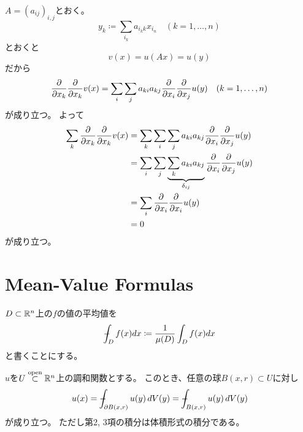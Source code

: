 \documentclass[report]{jlreq}
\begin{document}
\begin{answer}
    $A = (a_{ij})_{i,j}$とおく。
    \begin{equation}
        y_k \coloneqq \sum_{i_k} a_{i_k k} x_{i_n}
        \quad
        (k = 1, \dots, n)
    \end{equation}
    とおくと
    \begin{equation}
        v(x) = u(Ax) = u(y)
    \end{equation}
    だから
    \begin{equation}
        \deldel{x_k} \deldel{x_k} v(x)
            = \sum_{i} \sum_{j}
            a_{ki} a_{kj} \deldel{x_i} \deldel{x_j} u(y)
            \quad (k = 1, \dots, n)
    \end{equation}
    が成り立つ。
    よって
    \begin{alignat}{1}
        \sum_{k} \deldel{x_k} \deldel{x_k} v(x)
            &= \sum_{k} \sum_{i} \sum_{j}
                a_{ki} a_{kj} \deldel{x_i} \deldel{x_j} u(y) \\
            &= \sum_{i} \sum_{j}
                \underbrace{ \sum_{k} a_{ki} a_{kj} }_{\delta_{ij}}
                \deldel{x_i} \deldel{x_j} u(y) \\
            &= \sum_{i} \deldel{x_i} \deldel{x_i} u(y) \\
            &= 0
    \end{alignat}
    が成り立つ。
\end{answer}

%
\section{Mean-Value Formulas}

\begin{definition}[平均値の記法]
    $D \subset \mathbb{R}^n$上の$f$の値の平均値を
    \begin{equation}
        \dashint_D f(x) dx \coloneqq \frac{1}{\mu(D)} \int_D f(x) dx
    \end{equation}
    と書くことにする。
\end{definition}

\begin{theorem}
    $u$を$U \stackrel{\text{open}}{\subset} \mathbb{R}^n$上の調和関数とする。
    このとき、任意の球$B(x, r) \subset U$に対し
    \begin{equation}
        u(x) = \dashint_{\partial B(x, r)} u(y) \,dV(y)
            = \dashint_{B(x, r)} u(y) \,dV(y)
    \end{equation}
    が成り立つ。
    ただし第2, 3項の積分は体積形式の積分である。
\end{theorem}
\end{document}
